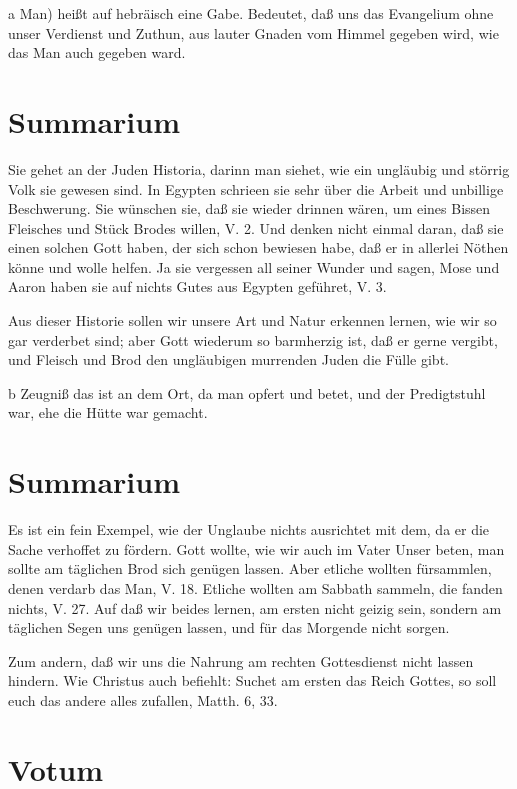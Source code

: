 a Man) heißt auf hebräisch eine Gabe. Bedeutet, daß uns das Evangelium ohne unser Verdienst und Zuthun, aus lauter Gnaden vom Himmel gegeben wird, wie das Man auch gegeben ward.

\section{Summarium}

Sie gehet an der Juden Historia, darinn man siehet, wie ein ungläubig und störrig Volk sie gewesen sind. In Egypten schrieen sie sehr über die Arbeit und unbillige Beschwerung. Sie wünschen sie, daß sie wieder drinnen wären, um eines Bissen Fleisches und Stück Brodes willen, V. 2. Und denken nicht einmal daran, daß sie einen solchen Gott haben, der sich schon bewiesen habe, daß er in allerlei Nöthen könne und wolle helfen. Ja sie vergessen all seiner Wunder und sagen, Mose und Aaron haben sie auf nichts Gutes aus Egypten geführet, V. 3.

Aus dieser Historie sollen wir unsere Art und Natur erkennen lernen, wie wir so gar verderbet sind; aber Gott wiederum so barmherzig ist, daß er gerne vergibt, und Fleisch und Brod den ungläubigen murrenden Juden die Fülle gibt.


b Zeugniß das ist an dem Ort, da man opfert und betet, und der Predigtstuhl war, ehe die Hütte war gemacht.


\section{Summarium}

Es ist ein fein Exempel, wie der Unglaube nichts ausrichtet mit dem, da er die Sache verhoffet zu fördern. Gott wollte, wie wir auch im Vater Unser beten, man sollte am täglichen Brod sich genügen lassen. Aber etliche wollten fürsammlen, denen verdarb das Man, V. 18. Etliche wollten am Sabbath sammeln, die fanden nichts, V. 27. Auf daß wir beides lernen, am ersten nicht geizig sein, sondern am täglichen Segen uns genügen lassen, und für das Morgende nicht sorgen.

Zum andern, daß wir uns die Nahrung am rechten Gottesdienst nicht lassen hindern. Wie Christus auch befiehlt: Suchet am ersten das Reich Gottes, so soll euch das andere alles zufallen, Matth. 6, 33.

\section{Votum}


